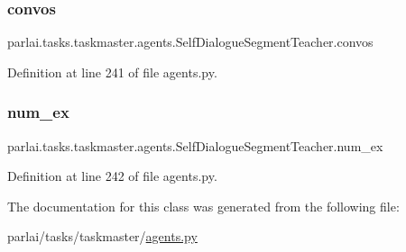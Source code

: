 \subsubsection{\texorpdfstring{convos}{convos}}
{\footnotesize\ttfamily parlai.\+tasks.\+taskmaster.\+agents.\+Self\+Dialogue\+Segment\+Teacher.\+convos}



Definition at line 241 of file agents.\+py.

\mbox{\label{classparlai_1_1tasks_1_1taskmaster_1_1agents_1_1SelfDialogueSegmentTeacher_a231381551fe76fdbf333c0fd8c671b5e}} 
\subsubsection{\texorpdfstring{num\+\_\+ex}{num\_ex}}
{\footnotesize\ttfamily parlai.\+tasks.\+taskmaster.\+agents.\+Self\+Dialogue\+Segment\+Teacher.\+num\+\_\+ex}



Definition at line 242 of file agents.\+py.



The documentation for this class was generated from the following file\+:\begin{DoxyCompactItemize}
\item 
parlai/tasks/taskmaster/\hyperlink{parlai_2tasks_2taskmaster_2agents_8py}{agents.\+py}\end{DoxyCompactItemize}
